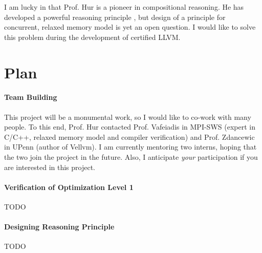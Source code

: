 \documentclass[nocopyrightspace]{sigplanconf}
\begin{document}
I am lucky in that Prof. Hur is a pioneer in compositional reasoning.
He has developed a powerful reasoning principle \cite{TODO}, but
design of a principle for concurrent, relaxed memory model is yet an
open question.  I would like to solve this problem during the
development of certified LLVM.

\section{Plan}

\paragraph{Team Building}
This project will be a monumental work, so I would like to co-work
with many people.  To this end, Prof. Hur contacted Prof. Vafeiadis in
MPI-SWS (expert in C/C++, relaxed memory model and compiler
verification) and Prof. Zdancewic in UPenn (author of Vellvm).  I am
currently mentoring two interns, hoping that the two join the project
in the future.  Also, I anticipate \emph{your} participation if you
are interested in this project.

\paragraph{Verification of Optimization Level 1}
TODO

\paragraph{Designing Reasoning Principle}
TODO






\end{document}
